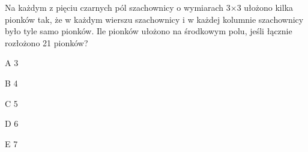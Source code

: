\begin{tresc}
Na każdym z pięciu czarnych pól szachownicy o wymiarach 3×3 ułożono kilka pionków tak, że w każdym wierszu szachownicy i w każdej kolumnie szachownicy było tyle samo pionków. Ile pionków ułożono na środkowym polu, jeśli łącznie rozłożono 21 pionków?
\end{tresc}
\begin{wariant}{A} 3 \end{wariant}
\begin{wariant}{B} 4 \end{wariant}
\begin{wariant}{C} 5 \end{wariant}
\begin{wariant}{D} 6 \end{wariant}
\begin{wariant}{E} 7 \end{wariant}
